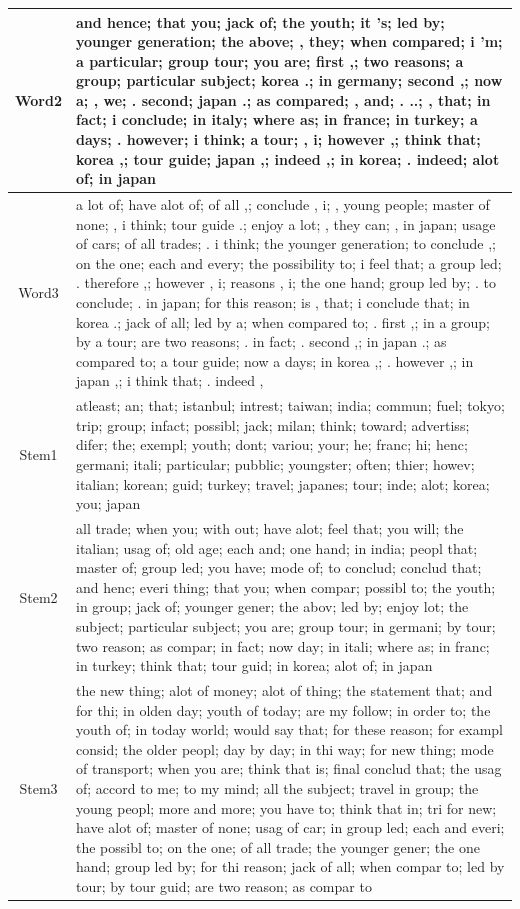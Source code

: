 \documentclass[11pt,letterpaper]{article}
\begin{document}
\begin{table}[t]
\begin{tabular}{|c|p{138mm}|}
\hline
Word2 & {and hence; that you; jack of; the youth; it 's; led by; younger generation; the above; , they; when compared; i 'm; a particular; group tour; you are; first ,; two reasons; a group; particular subject; korea .; in germany; second ,; now a; , we; . second; japan .; as compared; , and; . ..; , that; in fact; i conclude; in italy; where as; in france; in turkey; a days; . however; i think; a tour; , i; however ,; think that; korea ,; tour guide; japan ,; indeed ,; in korea; . indeed; alot of; in japan } \\
\hline
Word3 &  a lot of; have alot of; of all ,; conclude , i; , young people; master of none; , i think; tour guide .; enjoy a lot; , they can; , in japan; usage of cars; of all trades; . i think; the younger generation; to conclude ,; on the one; each and every; the possibility to; i feel that; a group led; . therefore ,; however , i; reasons , i; the one hand; group led by; . to conclude; . in japan; for this reason; is , that; i conclude that; in korea .; jack of all; led by a; when compared to; . first ,; in a group; by a tour; are two reasons; . in fact; . second ,; in japan .; as compared to; a tour guide; now a days; in korea ,; . however ,; in japan ,; i think that; . indeed ,\\
\hline
Stem1 & atleast; an; that; istanbul; intrest; taiwan; india; commun; fuel; tokyo; trip; group; infact; possibl; jack; milan; think; toward; advertiss; difer; the; exempl; youth; dont; variou; your; he; franc; hi; henc; germani; itali; particular; pubblic; youngster; often; thier; howev; italian; korean; guid; turkey; travel; japanes; tour; inde; alot; korea; you; japan \\
\hline
Stem2 & all trade; when you; with out; have alot; feel that; you will; the italian; usag of; old age; each and; one hand; in india; peopl that; master of; group led; you have; mode of; to conclud; conclud that; and henc; everi thing; that you; when compar; possibl to; the youth; in group; jack of; younger gener; the abov; led by; enjoy lot; the subject; particular subject; you are; group tour; in germani; by tour; two reason; as compar; in fact; now day; in itali; where as; in franc; in turkey; think that; tour guid; in korea; alot of; in japan \\
\hline
Stem3 & the new thing; alot of money; alot of thing; the statement that; and for thi; in olden day; youth of today; are my follow; in order to; the youth of; in today world; would say that; for these reason; for exampl consid; the older peopl; day by day; in thi way; for new thing; mode of transport; when you are; think that is; final conclud that; the usag of; accord to me; to my mind; all the subject; travel in group; the young peopl; more and more; you have to; think that in; tri for new; have alot of; master of none; usag of car; in group led; each and everi; the possibl to; on the one; of all trade; the younger gener; the one hand; group led by; for thi reason; jack of all; when compar to; led by tour; by tour guid; are two reason; as compar to \\

\end{tabular}
\end{table}
\end{document}
